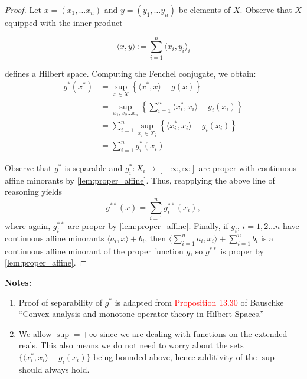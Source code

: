 \documentclass[11pt]{article}
\begin{document}
	
	\begin{proof}
		Let $x = (x_1, \ldots x_n)$ and $y = (y_1, \ldots y_n)$ be elements of $X$. Observe that $X$ equipped with the inner product 
		
		\[	\langle x, y\rangle := \sum_{i=1}^{n} \langle x_{i}, y_{i}\rangle_{i}
				\]
				
		\noindent defines a Hilbert space. 	Computing the Fenchel conjugate, we obtain:
		\begin{align*}
			g^{*}(x^{*}) 
			& = \sup_{x\in X}\left\{ 
									\langle x^*, x\rangle - g(x)
												\right\} \\
			& = \sup_{x_1,x_2\ldots x_n} \left\{
										\sum_{i=1}^{n} \langle x^{*}_{i}, x_i\rangle - g_{i}(x_i)
												\right\}	\\
			& = \sum_{i=1}^{n}	\sup_{x_i\in X_i} \left\{\langle x^{*}_{i}, x_i\rangle - g_{i}(x_i)\right\} \\
			& = \sum_{i=1}^{n} g_{i}^{*}(x_i)					
			\end{align*}
			
			\noindent Observe that $g^{*}$ is separable and $g_{i}^{*}:X_{i}\to[-\infty, \infty]$ are proper with continuous affine minorants by \autoref{lem:proper_affine}. Thus, reapplying the above line of reasoning yields 
			\[	g^{**}(x) = \sum_{i=1}^{n} g_{i}^{**}(x_i),
			\]
			where again, $g^{**}_{i}$ are proper by \autoref{lem:proper_affine}. Finally, if $g_{i}$, $i=1,2\ldots n$ have continuous affine minorants $\langle a_{i}, x\rangle + b_{i}$, then $\langle \sum_{i=1}^{n}a_i, x_i\rangle + \sum_{i=1}^{n} b_{i}$ is a continuous affine minorant of the proper function $g$, so $g^{**}$ is proper by \autoref{lem:proper_affine}.
		\end{proof}
			\newpage
			\textbf{Notes:}
			\begin{enumerate}
				\item Proof of separability of $g^{*}$ is adapted from \textcolor{red}{Proposition 13.30} of Bauschke ``Convex analysis and monotone operator theory in Hilbert Spaces.''
				
				\item We allow $\sup = +\infty$ since we are dealing with functions on the extended reals. This also means we do not need to worry about the sets $\{\langle x_i^{*}, x_i\rangle - g_{i}(x_i)\}$ being bounded above, hence additivity of the $\sup$ should always hold.  
				\end{enumerate}
		
	
		\printbibliography
\end{document}
